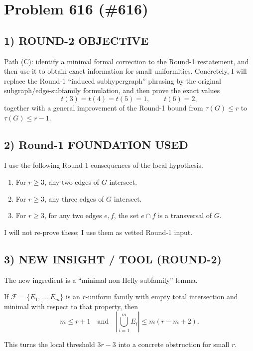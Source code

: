 
\section{Problem 616 (\#616)}

\subsection*{1) ROUND-2 OBJECTIVE}

Path (C): identify a minimal formal correction to the Round-1 restatement, and then use it to obtain exact information for small uniformities. Concretely, I will replace the Round-1 ``induced subhypergraph'' phrasing by the original subgraph/edge-subfamily formulation, and then prove the exact values
\[
t(3)=t(4)=t(5)=1,\qquad t(6)=2,
\]
together with a general improvement of the Round-1 bound from $\tau(G)\le r$ to $\tau(G)\le r-1$.

\subsection*{2) Round-1 FOUNDATION USED}

I use the following Round-1 consequences of the local hypothesis.

\begin{enumerate}
\item For $r\ge 3$, any two edges of $G$ intersect.
\item For $r\ge 3$, any three edges of $G$ intersect.
\item For $r\ge 3$, for any two edges $e,f$, the set $e\cap f$ is a transversal of $G$.
\end{enumerate}

I will not re-prove these; I use them as vetted Round-1 input.

\subsection*{3) NEW INSIGHT / TOOL (ROUND-2)}

The new ingredient is a ``minimal non-Helly subfamily'' lemma.

If $\mathcal{F}=\{E_1,\dots,E_m\}$ is an $r$-uniform family with empty total intersection and minimal with respect to that property, then
\[
m\le r+1
\quad\text{and}\quad
\left|\bigcup_{i=1}^m E_i\right|\le m(r-m+2).
\]

This turns the local threshold $3r-3$ into a concrete obstruction for small $r$.

